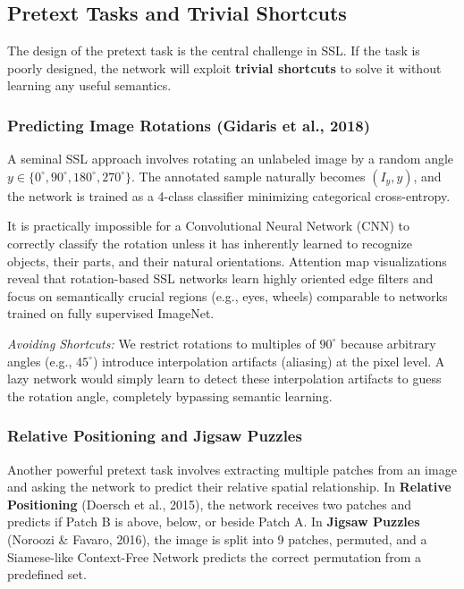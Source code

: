 \subsection{Pretext Tasks and Trivial Shortcuts}
The design of the pretext task is the central challenge in SSL. If the task is poorly designed, the network will exploit \textbf{trivial shortcuts} to solve it without learning any useful semantics.

\subsubsection{Predicting Image Rotations (Gidaris et al., 2018)}
A seminal SSL approach involves rotating an unlabeled image by a random angle $y \in \{0^\circ, 90^\circ, 180^\circ, 270^\circ\}$. The annotated sample naturally becomes $(I_y, y)$, and the network is trained as a 4-class classifier minimizing categorical cross-entropy. 

It is practically impossible for a Convolutional Neural Network (CNN) to correctly classify the rotation unless it has inherently learned to recognize objects, their parts, and their natural orientations. Attention map visualizations reveal that rotation-based SSL networks learn highly oriented edge filters and focus on semantically crucial regions (e.g., eyes, wheels) comparable to networks trained on fully supervised ImageNet.

\textit{Avoiding Shortcuts:} We restrict rotations to multiples of $90^\circ$ because arbitrary angles (e.g., $45^\circ$) introduce interpolation artifacts (aliasing) at the pixel level. A lazy network would simply learn to detect these interpolation artifacts to guess the rotation angle, completely bypassing semantic learning.

\subsubsection{Relative Positioning and Jigsaw Puzzles}
Another powerful pretext task involves extracting multiple patches from an image and asking the network to predict their relative spatial relationship. 
In \textbf{Relative Positioning} (Doersch et al., 2015), the network receives two patches and predicts if Patch B is above, below, or beside Patch A. In \textbf{Jigsaw Puzzles} (Noroozi \& Favaro, 2016), the image is split into 9 patches, permuted, and a Siamese-like Context-Free Network predicts the correct permutation from a predefined set.

